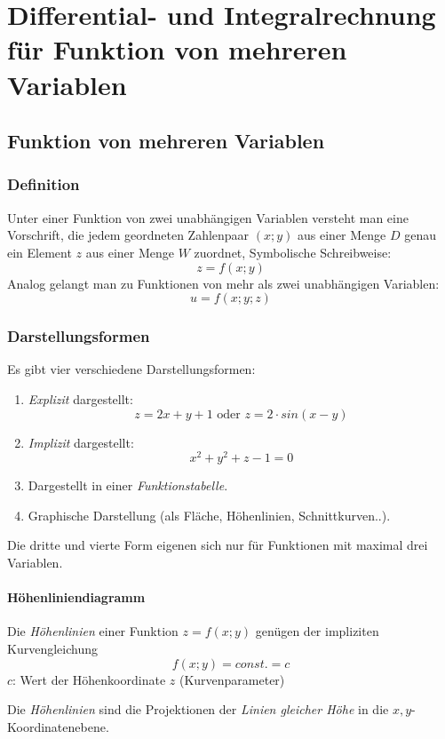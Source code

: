 \chapter{Differential- und Integralrechnung für Funktion von mehreren Variablen}
\section{Funktion von mehreren Variablen}
\subsection{Definition}
\begin{definition}
Unter einer Funktion von zwei unabhängigen Variablen versteht man eine Vorschrift, die jedem geordneten Zahlenpaar $(x;y)$ aus einer Menge $D$ genau ein Element $z$ aus einer Menge $W$ zuordnet, Symbolische Schreibweise: $$z=f(x;y)$$
Analog gelangt man zu Funktionen von mehr als zwei unabhängigen Variablen:
$$u=f(x;y;z)$$

\subsection{Darstellungsformen}
Es gibt vier verschiedene Darstellungsformen:
\begin{enumerate}
	\item \textit{Explizit} dargestellt:
	$$z = 2x + y + 1 \text{ oder } z = 2 \cdot sin(x-y)$$
	\item \textit{Implizit} dargestellt:
	$$ x^2 + y^2+z -1 = 0$$
	\item Dargestellt in einer \textit{Funktionstabelle}.
	\item Graphische Darstellung (als Fläche, Höhenlinien, Schnittkurven..).
\end{enumerate}
Die dritte und vierte Form eigenen sich nur für Funktionen mit maximal drei Variablen.
\end{definition}

\subsubsection{Höhenliniendiagramm}
\begin{definition}
Die \textit{Höhenlinien} einer Funktion $z=f(x;y)$ genügen der impliziten Kurvengleichung
$$f(x;y) = const. = c$$
$c$: Wert der Höhenkoordinate $z$ (Kurvenparameter)
\end{definition}
Die \textit{Höhenlinien} sind die Projektionen der \textit{Linien gleicher Höhe} in die $x, y$-Koordinatenebene.


